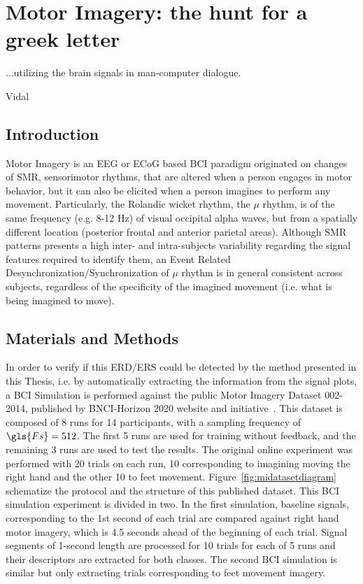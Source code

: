 \chapter{Motor Imagery: the hunt for a greek letter}
\label{chapter:five}
\epigraph{...utilizing the brain signals in man-computer dialogue.}{Vidal}

\section{Introduction}

Motor Imagery is an EEG or ECoG based BCI paradigm originated on changes of SMR, sensorimotor rhythms, that are altered when a person engages in motor behavior, but it can also be elicited when a person imagines to perform any movement. Particularly, the Rolandic wicket rhythm, the $\mu$ rhythm, is of the same frequency (e.g. 8-12 Hz) of visual occipital alpha waves, but from a spatially different location (posterior frontal and anterior parietal areas)\cite{WolpawJonathanR2012}.   Although SMR patterns presents a high inter- and intra-subjects variability regarding the signal features required to identify them, an Event Related Desynchronization/Synchronization of $\mu$ rhythm is in general consistent across subjects, regardless of the specificity of the imagined movement (i.e. what is being imagined to move).

\section{Materials and Methods}

In order to verify if this ERD/ERS could be detected by the method presented in this Thesis, i.e. by automatically extracting the information from the signal plots, a BCI Simulation is performed against the public Motor Imagery Dataset 002-2014, published by BNCI-Horizon 2020 website and initiative~\cite{Steyrl2015}.  This dataset is composed of 8 runs for 14 participants, with a sampling frequency of $\gls{Fs} = 512$. The first 5 runs are used for training without feedback, and the remaining 3 runs are used to test the results.  The original online experiment was performed with 20 trials on each run, 10 corresponding to imagining moving the right hand and the other 10 to feet movement.  Figure~\ref{fig:midatasetdiagram} schematize the protocol and the structure of this published dataset.  This BCI simulation experiment is divided in two.  In the first simulation, baseline signals, corresponding to the 1st second of each trial are compared against right hand motor imagery, which is 4.5 seconds ahead of the beginning of each trial. Signal segments of 1-second length are processed for 10 trials for each of 5 runs and their descriptors are extracted for both classes.  The second BCI simulation is similar but only extracting trials corresponding to feet movement imagery.

